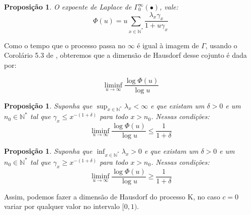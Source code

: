 \documentclass[11pt,twoside,a4paper]{article}
\newcommand{\Nz}{{\mathbb{N^*}}}
\newtheorem{proposicao}[teorema]{Proposição}
\begin{document}
\begin{proposicao}
  O expoente de Laplace de $\Gamma^\infty_0(\bullet)$, vale:
  \begin{equation}
    \label{eq:exp-laplace}
    \Phi(u) = 
    u \sum_{x \in \Nz} \frac{\lambda_x \gamma_x}{1 + u \gamma_x}
  \end{equation}
\end{proposicao}

Como o tempo que o processo passa no $\infty$ é igual à imagem de
$\Gamma$, usando o Corolário 5.3 de \cite{bertoin:97}, obteremos que a
dimensão de Hausdorf desse cojunto é dada por:

\begin{equation}
  \label{eq:dim-hausdorf}
  \liminf_{u \to \infty} \frac{\log \Phi(u)}{\log u} 
\end{equation}

\begin{proposicao}
  Suponha que $\sup_{x\in\Nz}\lambda_x < \infty$ e que existam um
  $\delta>0$ e um $n_0 \in \Nz$ tal que $\gamma_x \leq x^{-(1+\delta)}$
  para todo $x > n_0$. Nessas condições:
  \begin{equation}
    \liminf_{u \to \infty} \frac{\log \Phi(u)}{\log u}  \leq \frac{1}{1+\delta}
  \end{equation}
\end{proposicao}

\begin{proposicao}
  Suponha que $\inf_{x\in\Nz}\lambda_x  > 0$ e que existam um
  $\delta>0$ e um $n_0 \in \Nz$ tal que $\gamma_x \geq x^{-(1+\delta)}$
  para todo $x > n_0$. Nessas condições:
  \begin{equation}
    \liminf_{u \to \infty} \frac{\log \Phi(u)}{\log u}  \geq \frac{1}{1+\delta}
  \end{equation}
\end{proposicao}

Assim, podemos fazer a dimensão de Hausdorf do processo K, no caso $c
= 0$ variar por qualquer valor no intervalo $[0, 1)$.


\singlespacing   %
\end{document}

